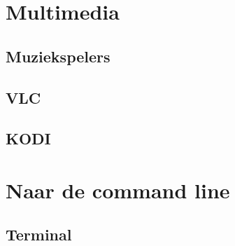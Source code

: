 \documentclass[a4paper,12pt,twoside,openright,titlepage]{book}
\begin{document}
\chapter{Multimedia}

\section{Muziekspelers}

\section{VLC}

\section{KODI}


\chapter{Naar de command line}
\section{Terminal}


\backmatter
\printindex
\end{document}
